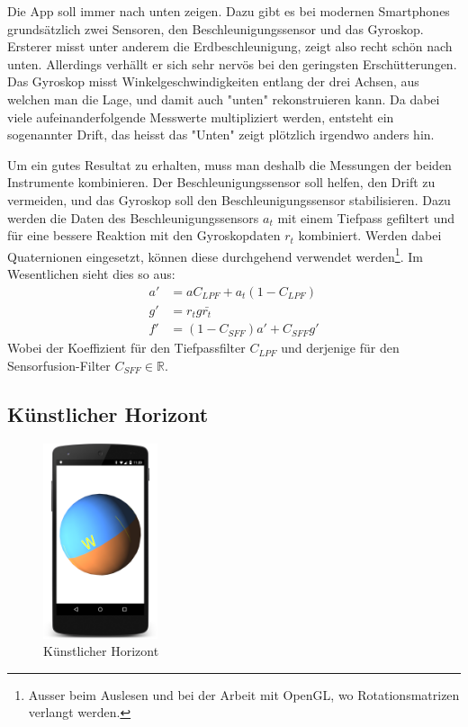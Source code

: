 \documentclass[12pt]{article}
\begin{document}
  Die App soll immer nach unten zeigen. Dazu gibt es bei modernen Smartphones grundsätzlich zwei Sensoren, den Beschleunigungssensor und das Gyroskop. Ersterer misst unter anderem die Erdbeschleunigung, zeigt also recht schön nach unten. Allerdings verhällt er sich sehr nervös bei den geringsten Erschütterungen. Das Gyroskop misst Winkelgeschwindigkeiten entlang der drei Achsen, aus welchen man die Lage, und damit auch "unten" rekonstruieren kann. Da dabei viele aufeinanderfolgende Messwerte multipliziert werden, entsteht ein sogenannter Drift, das heisst das "Unten" zeigt plötzlich irgendwo anders hin.

  Um ein gutes Resultat zu erhalten, muss man deshalb die Messungen der beiden Instrumente kombinieren. Der Beschleunigungssensor soll helfen, den Drift zu vermeiden, und das Gyroskop soll den Beschleunigungssensor stabilisieren. Dazu werden die Daten des Beschleunigungssensors $a_t$ mit einem Tiefpass gefiltert und für eine bessere Reaktion mit den Gyroskopdaten $r_t$ kombiniert. Werden dabei Quaternionen eingesetzt, können diese durchgehend verwendet werden\footnote{Ausser beim Auslesen und bei der Arbeit mit OpenGL, wo Rotationsmatrizen verlangt werden.}. Im Wesentlichen sieht dies so aus:
  \begin{align*}
    a' &= a C_{LPF} +  a_t (1 - C_{LPF}) \\
    g' &= r_t g \bar{r_t}    \\
    f' &= (1 - C_{SFF}) a' + C_{SFF} g'
  \end{align*}
  Wobei der Koeffizient für den Tiefpassfilter $C_{LPF}$ und derjenige für den Sensorfusion-Filter $C_{SFF} \in \mathbb{R}$.


  \subsection{Künstlicher Horizont}

\begin{figure} %
    \centering
    \includegraphics[width=0.3\textwidth]{artificial-horizon.png}
    \caption{Künstlicher Horizont}
    \label{fig:screenshot_artificial_horizon}
\end{figure}
\end{document}
